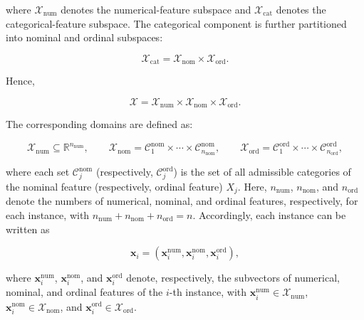 where $\mathcal{X}_{\mathrm{num}}$ denotes the numerical-feature subspace and $\mathcal{X}_{\mathrm{cat}}$ denotes the categorical-feature subspace. The categorical component is further partitioned into nominal and ordinal subspaces:

\begin{equation}
  \mathcal{X}_{\mathrm{cat}} = \mathcal{X}_{\mathrm{nom}} \times \mathcal{X}_{\mathrm{ord}}.
\end{equation}

Hence,

\begin{equation}
  \mathcal{X} = \mathcal{X}_{\mathrm{num}} \times \mathcal{X}_{\mathrm{nom}} \times \mathcal{X}_{\mathrm{ord}}.
\end{equation}

The corresponding domains are defined as:

\begin{equation}
  \mathcal{X}_{\mathrm{num}} \subseteq \mathbb{R}^{n_{\mathrm{num}}},
  \qquad
  \mathcal{X}_{\mathrm{nom}} = \mathcal{C}_1^{\mathrm{nom}} \times \cdots \times \mathcal{C}_{n_{\mathrm{nom}}}^{\mathrm{nom}},
  \qquad
  \mathcal{X}_{\mathrm{ord}} = \mathcal{C}_1^{\mathrm{ord}} \times \cdots \times \mathcal{C}_{n_{\mathrm{ord}}}^{\mathrm{ord}},
\end{equation}

where each set $\mathcal{C}_j^{\mathrm{nom}}$ (respectively, $\mathcal{C}_j^{\mathrm{ord}}$) is the set of all admissible categories of the nominal feature (respectively, ordinal feature) $X_j$. Here, $n_{\mathrm{num}}$, $n_{\mathrm{nom}}$, and $n_{\mathrm{ord}}$ denote the numbers of numerical, nominal, and ordinal features, respectively, for each instance, with $n_{\mathrm{num}} + n_{\mathrm{nom}} + n_{\mathrm{ord}} = n$. Accordingly, each instance can be written as

\begin{equation}
  \mathbf{x}_i = (\mathbf{x}_i^{\mathrm{num}}, \mathbf{x}_i^{\mathrm{nom}}, \mathbf{x}_i^{\mathrm{ord}}),
\end{equation}

where $\mathbf{x}_i^{\mathrm{num}}$, $\mathbf{x}_i^{\mathrm{nom}}$, and $\mathbf{x}_i^{\mathrm{ord}}$ denote, respectively, the subvectors of numerical, nominal, and ordinal features of the $i$-th instance, with $\mathbf{x}_i^{\mathrm{num}} \in \mathcal{X}_{\mathrm{num}}$, $\mathbf{x}_i^{\mathrm{nom}} \in \mathcal{X}_{\mathrm{nom}}$, and $\mathbf{x}_i^{\mathrm{ord}} \in \mathcal{X}_{\mathrm{ord}}$.

